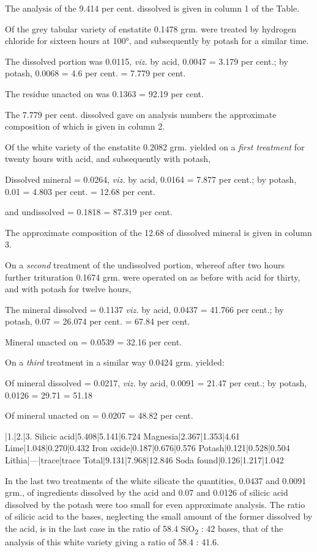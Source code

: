 \documentclass[a4paper, 12pt, oneside]{article}
\begin{document}
The analysis of the 9.414 per cent. dissolved is given in column 1 of the Table.

Of the grey tabular variety of enstatite 0.1478 grm. were treated by hydrogen chloride for sixteen hours at 100°, and subsequently by potash for a similar time.

The dissolved portion was 0.0115, \emph{viz.} {by acid, 0.0047 = 3.179 per cent.; by potash, 0.0068 = 4.6 per cent.} = 7.779 per cent.

The residue unacted on was 0.1363 = 92.19 per cent.

The 7.779 per cent. dissolved gave on analysis numbers the approximate composition of which is given in column 2.

Of the white variety of the enstatite 0.2082 grm. yielded on a \emph{first treatment} for twenty hours with acid, and subsequently with potash,

Dissolved mineral = 0.0264, \emph{viz.} {by acid, 0.0164 = 7.877 per cent.; by potash, 0.01 = 4.803 per cent.} = 12.68 per cent.

and undissolved = 0.1818 = 87.319 per cent.

The approximate composition of the 12.68 of dissolved mineral is given in column 3.

On a \emph{second} treatment of the undissolved portion, whereof after two hours further trituration 0.1674 grm. were operated on as before with acid for thirty, and with potash for twelve hours,

The mineral dissolved = 0.1137 \emph{viz.} {by acid, 0.0437 = 41.766 per cent.; by potash, 0.07 = 26.074 per cent.} = 67.84 per cent.

Mineral unacted on = 0.0539 = 32.16 per cent.

On a \emph{third} treatment in a similar way 0.0424 grm. yielded:

Of mineral dissolved = 0.0217, \emph{viz.} {by acid, 0.0091 = 21.47 per cent.; by potash, 0.0126 = 29.71} = 51.18

Of mineral unacted on = 0.0207 = 48.82 per cent.

|1.|2.|3.  
Silicic acid|5.408|5.141|6.724  
Magnesia|2.367|1.353|4.61  
Lime|1.048|0.270|0.432  
Iron oxide|0.187|0.676|0.576  
Potash|0.121|0.528|0.504  
Lithia|---|trace|trace  
Total|9.131|7.968|12.846  
Soda found|0.126|1.217|1.042

In the last two treatments of the white silicate the quantities, 0.0437 and 0.0091 grm., of ingredients dissolved by the acid and 0.07 and 0.0126 of silicic acid dissolved by the potash were too small for even approximate analysis. The ratio of silicic acid to the bases, neglecting the small amount of the former dissolved by the acid, is in the last case in the ratio of 58.4 SiO\textsubscript{2} : 42 bases, that of the analysis of this white variety giving a ratio of 58.4 : 41.6.
\end{document}

